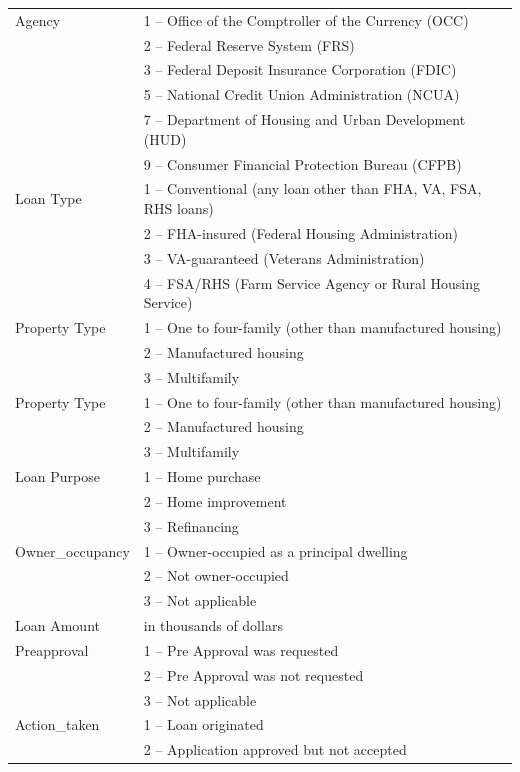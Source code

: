 \documentclass{jpp}
\begin{document}
\begin{center}
\begin{longtable}{|p{3cm}|p{10cm}|}
  \hline
  Agency & 1 -- Office of the Comptroller of the Currency (OCC) \\
         & 2 -- Federal Reserve System (FRS) \\ 
         & 3 -- Federal Deposit Insurance Corporation (FDIC) \\ 
         & 5 -- National Credit Union Administration (NCUA) \\ 
         & 7 -- Department of Housing and Urban Development (HUD) \\ & 9 -- Consumer Financial Protection Bureau (CFPB) \\
  \hline
  Loan Type  & 1 -- Conventional (any loan other than FHA, VA, FSA, RHS loans) \\ 
             & 2 -- FHA-insured (Federal Housing Administration) \\ 
             & 3 -- VA-guaranteed (Veterans Administration) \\ 
             & 4 -- FSA/RHS (Farm Service Agency or Rural Housing Service) \\
  \hline
  Property Type  & 1 -- One to four-family (other than manufactured housing) \\ 
  & 2 -- Manufactured housing \\ 
  & 3 -- Multifamily \\ 
  \hline
  Property Type  & 1 -- One to four-family (other than manufactured housing) \\ 
  & 2 -- Manufactured housing \\ 
  & 3 -- Multifamily \\ 
  \hline
  Loan Purpose & 1 -- Home purchase \\ 
  & 2 -- Home improvement \\ 
  & 3 -- Refinancing \\ 
  \hline
  Owner\_occupancy & 1 -- Owner-occupied as a principal dwelling \\
  & 2 -- Not owner-occupied \\ 
  & 3 -- Not applicable \\ 
  \hline
  Loan Amount & in thousands of dollars \\ 
  \hline
  Preapproval & 1 -- Pre Approval was requested \\ 
  & 2 -- Pre Approval was not requested \\ 
  & 3 -- Not applicable \\ 
  \hline
  Action\_taken  & 1 -- Loan originated \\ 
  & 2 -- Application approved but not accepted \\ 

\end{longtable}
\end{center}
\end{document}
